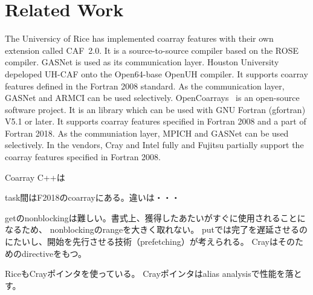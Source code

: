 \section{Related Work}\label{sec:related}

The Universicy of Rice has implemented coarray features with their own extension called CAF~2.0.
It is a source-to-source compiler based on the ROSE compiler. GASNet is used as its 
communication layer.
%
Houston University depeloped UH-CAF onto the Open64-base OpenUH compiler. It supports
coarray features defined in the Fortran 2008 standard. As the communication layer,
GASNet and ARMCI can be used selectively.
%
OpenCoarrays~\cite{OpenCo} is an open-source software project. It is an library 
which can be used with GNU Fortran (gfortran) V5.1 or later. It supports coarray features
specified in Fortran 2008 and a part of Fortran 2018.  As the communiation layer,
MPICH and GASNet can be used selectively.
%
In the vendors, Cray and Intel fully and Fujitsu partially support the coarray features
specified in Fortran 2008.


Coarray C++は

task間はF2018のcoarrayにある。違いは・・・

getのnonblockingは難しい。書式上、獲得したあたいがすぐに使用されることになるため、
nonblockingのrangeを大きく取れない。
putでは完了を遅延させるのにたいし、開始を先行させる技術（prefetching）が考えられる。
Crayはそのためのdirectiveをもつ。

RiceもCrayポインタを使っている。
Crayポインタはalias analysisで性能を落とす。


